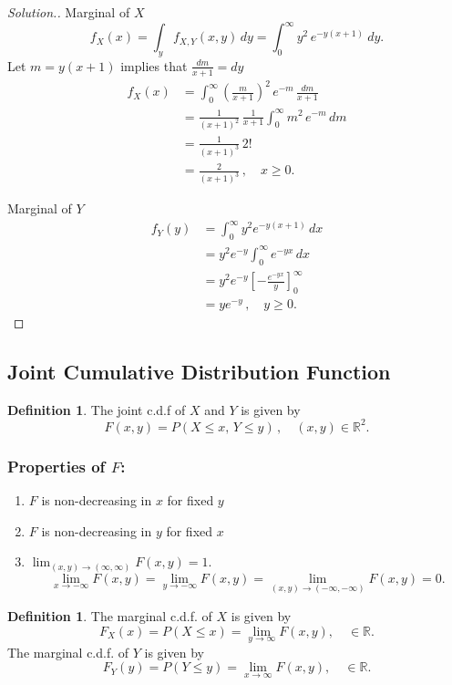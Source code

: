 \documentclass[12pt,a4paper]{report}
\theoremstyle{definition}
\newtheorem{definition}[thm]{Definition}
\theoremstyle{plain}
\theoremstyle{definition}
\begin{document}
\begin{proof}[\textit{Solution}.]
Marginal of $X$
\[f_X(x)  = \int_y f_{X,Y}(x,y)\,dy = \int^{\infty}_0y^2\,e^{-y(x+1)}\ dy.\]
Let $m = y(x + 1)$ implies that $\frac{dm}{x + 1} = dy$
\begin{align*}
f_X(x) & = \int^{\infty}_0\left(\frac{m}{x + 1}\right)^2\, e^{-m}\, \frac{dm}{x + 1}\\
& = \frac{1}{(x + 1)^2}\, \frac{1}{x + 1}\int^{\infty}_0m^2\, e^{-m}\, dm\\
& = \frac{1}{(x + 1)^3}\, 2!\\
& = \frac{2}{(x + 1)^3}\,, \quad x\geq 0.
\end{align*}

Marginal of $Y$
\begin{align*}
f_Y(y) & = \int_0^{\infty} y^2 e^{-y(x+1)}\, dx\\
& = y^2e^{-y}\int^{\infty}_0e^{-yx}\, dx\\
& = y^2e^{-y}\left[-\frac{e^{-yx}}{y}\right]^{\infty}_0\\
& = ye^{-y}\, , \quad y\geq 0.
\end{align*}
\end{proof}



\subsection{Joint Cumulative Distribution Function}
\begin{definition}
The joint c.d.f of $X$ and $Y$ is given by \[F(x,y) = P(X \leq x, \, Y\leq y)\,, \quad (x,y)\in \mathbb{
R}^2.\]
\end{definition}

\subsubsection{Properties of $F$:}
\begin{enumerate}
\item[(i).] $F$ is non-decreasing in $x$ for fixed $y$
\item[(ii).] $F$ is non-decreasing in $y$ for fixed $x$
\item[(iii).] $\lim_{(x,y)\rightarrow (\infty,\infty)} F(x,y) = 1$.
\[\lim_{x\rightarrow -\infty}F(x,y) = \lim_{y\rightarrow -\infty} F(x,y) = \lim_{(x,y)\rightarrow (-\infty, -\infty)} F(x,y) =0.\]
\end{enumerate}




\begin{definition}
The marginal c.d.f. of $X$ is given by \[F_X(x) = P(X\leq x) = \lim_{y\rightarrow \infty}F(x,y), \quad \in \mathbb{R}.\]
The marginal c.d.f. of $Y$ is given by \[F_Y(y) = P(Y\leq y) = \lim_{x\rightarrow \infty} F(x,y), \quad \in \mathbb{R}.\]
\end{definition}
\end{document}
